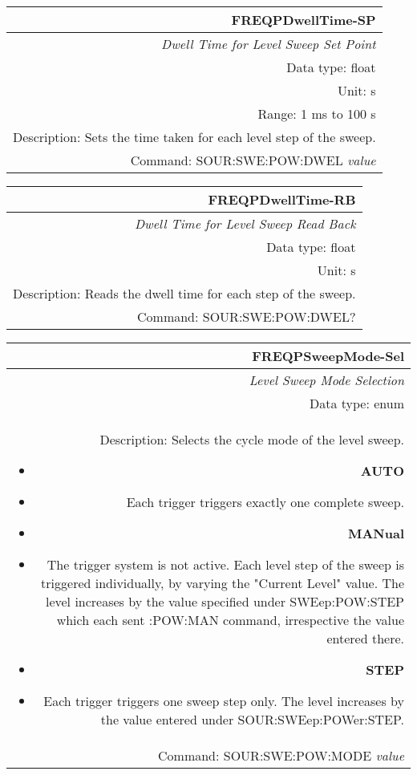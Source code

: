 \documentclass[openany]{article}
\begin{document}
%
		\begin{tabular}{N}
			\hline
			\bfseries FREQPDwellTime-SP \\ \hline
			\emph{Dwell Time for Level Sweep Set Point} \\
			Data type: float \\
			Unit: s \\
			Range: 1 ms to 100 s \\
			Description: Sets the time taken for each level step of the sweep. \\
			Command: SOUR:SWE:POW:DWEL \emph{value} \\
			
		\end{tabular}


		\begin{tabular}{N}
			\hline
			\bfseries FREQPDwellTime-RB \\ \hline
			\emph{Dwell Time for Level Sweep Read Back} \\
			Data type: float \\
			Unit: s \\
			Description: Reads the dwell time for each step of the sweep. \\
			Command: SOUR:SWE:POW:DWEL? \\

		\end{tabular}
%
		\begin{tabular}{N}
			\hline
			\bfseries FREQPSweepMode-Sel \\ \hline
			\emph{Level Sweep Mode Selection} \\
			Data type: enum \\
			Description: Selects the cycle mode of the level sweep.\begin{itemize}[noitemsep]
				\small
				\item[] \textbf{AUTO}
				\item[] Each trigger triggers exactly one complete sweep.
				\item[] \textbf{MANual}
				\item[] The trigger system is not active. Each level step of the sweep is triggered individually, by varying the "Current Level" value. The level increases by the value specified under SWEep:POW:STEP which each sent :POW:MAN command, irrespective the value entered there.
				\item[] \textbf{STEP}
				\item[] Each trigger triggers one sweep step only. The level increases by the value entered under SOUR:SWEep:POWer:STEP.
			\end{itemize} \\
			Command: SOUR:SWE:POW:MODE \emph{value} \\

		\end{tabular}
\end{document}

